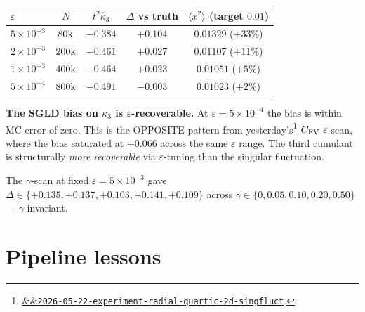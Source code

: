 \documentclass[11pt]{article}
\newcommand{\experimentref}[2][]{\href{https://therisensea.org/experiments/#2/}{\ifx&#1&\texttt{#2}\else#1\fi}}
\begin{document}
\begin{center}\small
\begin{tabular}{lcccc}
\toprule
$\varepsilon$ & $N$ & $t^2 \hat\kappa_3$ & $\Delta$ vs truth &
  $\langle x^2 \rangle$ (target $0.01$) \\
\midrule
$5 \times 10^{-3}$ & $80\rm{k}$  & $-0.384$ & $+0.104$ & $0.01329$ ($+33\%$) \\
$2 \times 10^{-3}$ & $200\rm{k}$ & $-0.461$ & $+0.027$ & $0.01107$ ($+11\%$) \\
$1 \times 10^{-3}$ & $400\rm{k}$ & $-0.464$ & $+0.023$ & $0.01051$ ($+5\%$) \\
$5 \times 10^{-4}$ & $800\rm{k}$ & $-0.491$ & $-0.003$ & $0.01023$ ($+2\%$) \\
\bottomrule
\end{tabular}
\end{center}

\textbf{The SGLD bias on $\kappa_3$ is $\varepsilon$-recoverable.} At
$\varepsilon = 5{\times}10^{-4}$ the bias is within MC error of zero.
This is the OPPOSITE pattern from
yesterday's\footnote{\experimentref{2026-05-22-experiment-radial-quartic-2d-singfluct}.}
$C_{\rm FV}$ $\varepsilon$-scan, where the bias saturated at $+0.066$
across the same $\varepsilon$ range. The third cumulant is structurally
\emph{more recoverable} via $\varepsilon$-tuning than the singular
fluctuation.

The $\gamma$-scan at fixed $\varepsilon = 5{\times}10^{-3}$ gave
$\Delta \in \{+0.135, +0.137, +0.103, +0.141, +0.109\}$ across
$\gamma \in \{0, 0.05, 0.10, 0.20, 0.50\}$ --- $\gamma$-invariant.

\section{Pipeline lessons}
\end{document}
